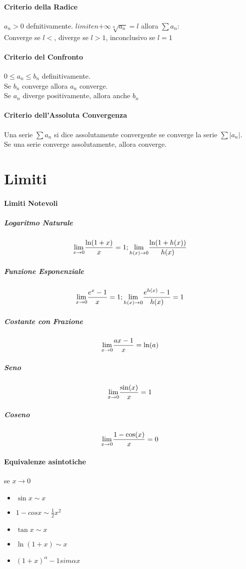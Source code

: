 \documentclass[12pt, a4paper, openany]{book}
\begin{document}
	\paragraph*{Criterio della Radice}
$a_n>0$ defnitivamente. $limite{n}{+\infty} \sqrt[n]{a_n}=l$ allora $\sum a_n$:
	\\Converge se $l<$, diverge se $l>1$, inconclusivo se $l=1$
	\paragraph*{Criterio del Confronto}
$0\leq a_n \leq b_n$  definitivamente.
	\\Se $b_n$ converge allora $a_n$ converge.
	\\Se $a_n$ diverge positivamente, allora anche $b_n$
	\paragraph*{Criterio dell'Assoluta Convergenza}
	Una serie $\sum a_n$ si dice assolutamente convergente se converge la serie $\sum |a_n|$.
	\\Se una serie converge assolutamente, allora converge.

	\section*{Limiti}
	\paragraph*{Limiti Notevoli}

	\subparagraph*{Logaritmo Naturale}
	$$\underset{x \to 0}{\lim} \frac{\ln(1+x)}{x} = 1 ; \underset{h(x) \to 0}{\lim} \frac{\ln(1+h(x))}{h(x)}$$

	\subparagraph*{Funzione Esponenziale}
	$$\underset{x \to 0}{\lim} \frac{e^x-1}{x} = 1; \underset{h(x) \to 0}{\lim} \frac{e^{h(x)}-1}{h(x)} = 1$$

	\subparagraph*{Costante con Frazione}
	$$\underset{x \to 0}{\lim}\frac{ax -1}{x} = \ln(a)$$

	\subparagraph*{Seno}
	$$\underset{x \to 0}{\lim}\frac{\sin(x)}{x} = 1$$

	\subparagraph*{Coseno}
	$$\underset{x \to 0}{\lim} \frac{1-\cos(x)}{x} = 0 $$

	\paragraph*{Equivalenze asintotiche} se $x\to 0$
	\begin{itemize}
		\item $\sin x \sim x$
		\item $1-cos x \sim \frac{1}{2}x^2$
		\item $\tan x \sim x$
		\item $\ln(1+x) \sim x$
		\item $(1+x)^\alpha -1 sim \alpha x$
	\end{itemize}
\end{document}
